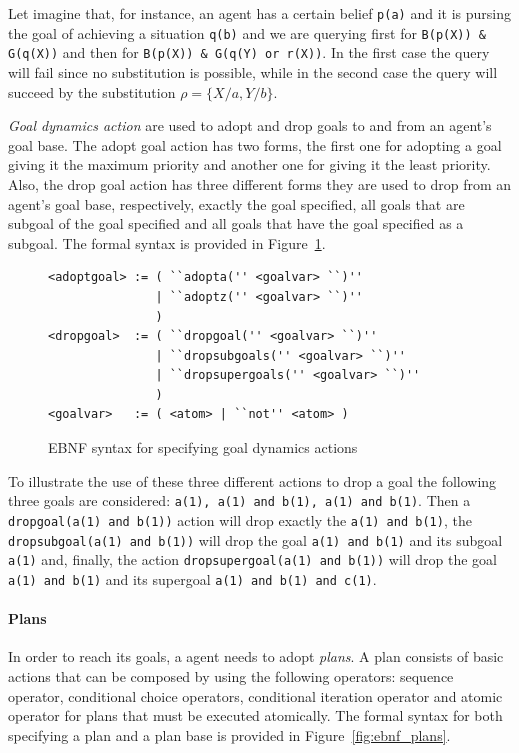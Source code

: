 \documentclass[a4paper]{article}
\begin{document}
Let imagine that, for instance, an agent has a certain belief \texttt{p(a)} and it is  pursing the goal of achieving a situation \texttt{q(b)} and we are querying first for \texttt{B(p(X)) \& G(q(X))} and then for \texttt{B(p(X)) \& G(q(Y) or r(X))}. In the first case the query will fail since no substitution is possible, while in the second case the query will succeed by the substitution $\rho=\{X/a, Y/b\}$.

\emph{Goal dynamics action} are used to adopt and drop goals to and from an agent's goal base. The adopt goal action has two forms, the first one for adopting a goal giving it the maximum priority and another one for giving it the least priority. Also, the drop goal action has three different forms they are used to drop from an agent’s goal base, respectively, exactly the goal specified, all goals that are subgoal of the goal specified and all goals that have the goal specified as a subgoal. The formal syntax is provided in Figure~\ref{fig:ebnf_goalactions}.

\begin{figure}[htp]
\begin{verbatim}
<adoptgoal> := ( ``adopta('' <goalvar> ``)''
               | ``adoptz('' <goalvar> ``)''
               )
<dropgoal>  := ( ``dropgoal('' <goalvar> ``)''
               | ``dropsubgoals('' <goalvar> ``)''
               | ``dropsupergoals('' <goalvar> ``)''
               )
<goalvar>   := ( <atom> | ``not'' <atom> )
\end{verbatim}
\caption{EBNF syntax for specifying goal dynamics actions}
\label{fig:ebnf_goalactions}
\end{figure}

To illustrate the use of these three different actions to drop a goal the following three goals are considered: \texttt{a(1), a(1) and b(1), a(1) and b(1)}. Then a \texttt{dropgoal(a(1) and b(1))} action will drop exactly the \texttt{a(1) and b(1)}, the \texttt{dropsubgoal(a(1) and b(1))} will drop the goal \texttt{a(1) and b(1)} and its subgoal \texttt{a(1)} and, finally, the action \texttt{dropsupergoal(a(1) and b(1))} will drop the goal \texttt{a(1) and b(1)} and its supergoal \texttt{a(1) and b(1) and c(1)}.

\paragraph{Plans}

In order to reach its goals, a agent needs to adopt \emph{plans}. A plan consists of basic actions that can be composed by using the following operators: sequence operator, conditional choice operators, conditional iteration operator and atomic operator for plans that must be executed atomically. The formal syntax for both specifying a plan and a plan base is provided in Figure~\ref{fig:ebnf_plans}.
\end{document}
